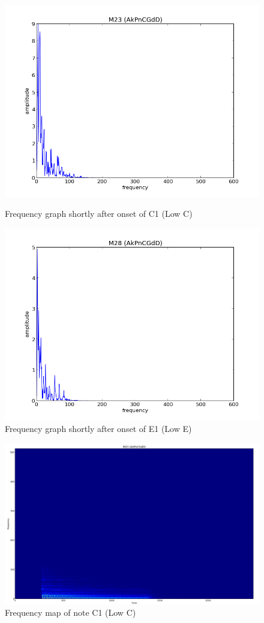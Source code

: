 \documentclass{article}
\begin{document}
\begin{figure}
\includegraphics[scale=.4]{singlefreq_m23.png}
\caption{Frequency graph shortly after onset of C1 (Low C)}
\includegraphics[scale=.4]{singlefreq_m28.png}
\caption{Frequency graph shortly after onset of E1 (Low E)}
\end{figure}


\begin{figure}
\includegraphics[scale=.12]{freq_m23.png}
\caption{Frequency map of note C1 (Low C)}
\end{figure}
\end{document}
